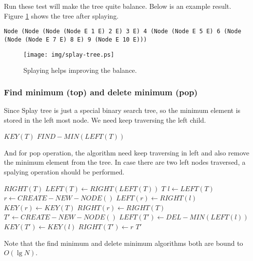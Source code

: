\documentclass{article}
\begin{document}
Run these test will make the tree quite balance. Below is an example
result. Figure \ref{fig:splay-result} shows the tree after splaying.

\begin{verbatim}
Node (Node (Node (Node E 1 E) 2 E) 3 E) 4 (Node (Node E 5 E) 6 (Node 
(Node (Node E 7 E) 8 E) 9 (Node E 10 E)))
\end{verbatim}

\begin{figure}[htbp]
   \begin{center}
   	  \texttt{[image: img/splay-tree.ps]}
          \caption{Splaying helps improving the balance.} \label{fig:splay-result}
   \end{center}
\end{figure}

\subsubsection{Find minimum (top) and delete minimum (pop)}
Since Splay tree is just a special binary search tree, so the minimum
element is stored in the left most node. We need keep traversing
the left child.

\begin{algorithmic}[1]
    \State \Return $KEY(T)$
  \Else
    \State \Return $FIND-MIN(LEFT(T))$
  \EndIf
\EndFunction
\end{algorithmic}

And for pop operation, the algorithm need keep traversing in left
and also remove the minimum element from the tree. In case there
are two left nodes traversed, a spalying operation should be performed.

\begin{algorithmic}[1]
    \State \Return $RIGHT(T)$
    \State $LEFT(T) \gets RIGHT(LEFT(T))$
    \State \Return $T$
  \Else
    \State $l \gets LEFT(T)$
    \State $r \gets CREATE-NEW-NODE()$
    \State $LEFT(r) \gets RIGHT(l)$
    \State $KEY(r) \gets KEY(T)$
    \State $RIGHT(r) \gets RIGHT(T)$
    \State $T' \gets CREATE-NEW-NODE()$
    \State $LEFT(T') \gets DEL-MIN(LEFT(l))$
    \State $KEY(T') \gets KEY(l)$
    \State $RIGHT(T') \gets r$
    \State \Return $T'$
  \EndIf
\EndFunction
\end{algorithmic}

Note that the find minimum and delete minimum algorithms both are
bound to $O(\lg N)$.
\end{document}

